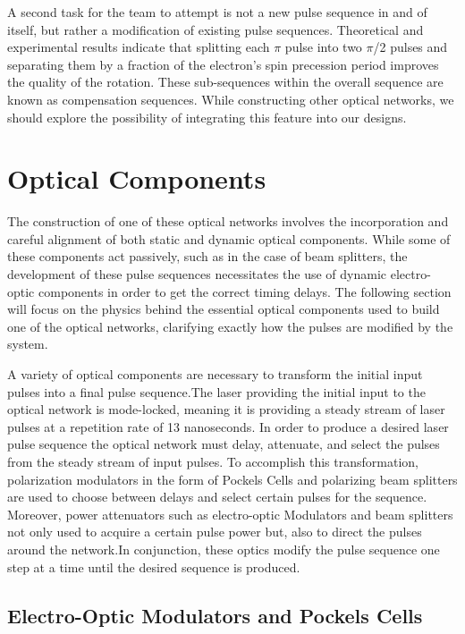 \documentclass[pdftex,12pt,a4paper]{article}
\begin{document}
A second task for the team to attempt is not a new pulse sequence in and of itself, but rather a modification of existing pulse sequences. Theoretical and experimental results indicate that splitting each $\pi$ pulse into two $\pi$/2 pulses and separating them by a fraction of the electron’s spin precession period improves the quality of the rotation\cite{soare_experimental_2014}. These sub-sequences within the overall sequence are known as compensation sequences. While constructing other optical networks, we should explore the possibility of integrating this feature into our designs.

\section{Optical Components}
The construction of one of these optical networks involves the incorporation and careful alignment of both static and dynamic optical components. While some of these components act passively, such as in the case of beam splitters, the development of these pulse sequences necessitates the use of dynamic electro-optic components in order to get the correct timing delays. The following section will focus on the physics behind the essential optical components used to build one of the optical networks, clarifying exactly how the pulses are modified by the system.

A variety of optical components are necessary to transform the initial input pulses into a final pulse sequence.The laser providing the initial input to the optical network is mode-locked, meaning it is providing a steady stream of laser pulses at a repetition rate of 13 nanoseconds. In order to produce a desired laser pulse sequence the optical network must delay, attenuate, and select the pulses from the steady stream of input pulses. To accomplish this transformation, polarization modulators in the form of Pockels Cells and polarizing beam splitters are used to choose between delays and select certain pulses for the sequence. Moreover, power attenuators such as electro-optic Modulators and beam splitters not only used to acquire a certain pulse power but, also to direct the pulses around the network.In conjunction, these optics modify the pulse sequence one step at a time until the desired sequence is produced.       

\subsection{Electro-Optic Modulators and Pockels Cells}
\end{document}
